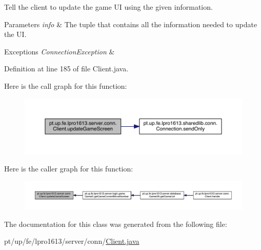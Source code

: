 Tell the client to update the game UI using the given information.


\begin{DoxyParams}{Parameters}
{\em info} & The tuple that contains all the information needed to update the UI. \\
\hline
\end{DoxyParams}

\begin{DoxyExceptions}{Exceptions}
{\em Connection\+Exception} & \\
\hline
\end{DoxyExceptions}


Definition at line 185 of file Client.\+java.

Here is the call graph for this function\+:
\nopagebreak
\begin{figure}[H]
\begin{center}
\leavevmode
\includegraphics[width=350pt]{classpt_1_1up_1_1fe_1_1lpro1613_1_1server_1_1conn_1_1_client_ad3cc8b10b942f6260a0e7db7f5a0a538_cgraph}
\end{center}
\end{figure}
Here is the caller graph for this function\+:
\nopagebreak
\begin{figure}[H]
\begin{center}
\leavevmode
\includegraphics[width=350pt]{classpt_1_1up_1_1fe_1_1lpro1613_1_1server_1_1conn_1_1_client_ad3cc8b10b942f6260a0e7db7f5a0a538_icgraph}
\end{center}
\end{figure}


The documentation for this class was generated from the following file\+:\begin{DoxyCompactItemize}
\item 
pt/up/fe/lpro1613/server/conn/\hyperlink{_client_8java}{Client.\+java}\end{DoxyCompactItemize}
